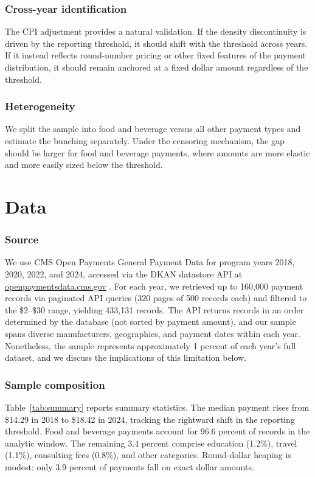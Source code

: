 \documentclass[12pt]{article}
\begin{document}
\subsubsection*{Cross-year identification} The CPI adjustment provides a natural validation. If the density discontinuity is driven by the reporting threshold, it should shift with the threshold across years. If it instead reflects round-number pricing or other fixed features of the payment distribution, it should remain anchored at a fixed dollar amount regardless of the threshold.

\subsubsection*{Heterogeneity} We split the sample into food and beverage versus all other payment types and estimate the bunching separately. Under the censoring mechanism, the gap should be larger for food and beverage payments, where amounts are more elastic and more easily sized below the threshold.

\section{Data}

\subsubsection*{Source} We use CMS Open Payments General Payment Data for program years 2018, 2020, 2022, and 2024, accessed via the DKAN datastore API at \url{openpaymentsdata.cms.gov} \citep{cmsopenpaymentsdata}. For each year, we retrieved up to 160,000 payment records via paginated API queries (320 pages of 500 records each) and filtered to the \$2--\$30 range, yielding 433,131 records. The API returns records in an order determined by the database (not sorted by payment amount), and our sample spans diverse manufacturers, geographies, and payment dates within each year. Nonetheless, the sample represents approximately 1 percent of each year's full dataset, and we discuss the implications of this limitation below.

\subsubsection*{Sample composition} Table~\ref{tab:summary} reports summary statistics. The median payment rises from \$14.29 in 2018 to \$18.42 in 2024, tracking the rightward shift in the reporting threshold. Food and beverage payments account for 96.6 percent of records in the analytic window. The remaining 3.4 percent comprise education (1.2\%), travel (1.1\%), consulting fees (0.8\%), and other categories. Round-dollar heaping is modest: only 3.9 percent of payments fall on exact dollar amounts.
\end{document}
